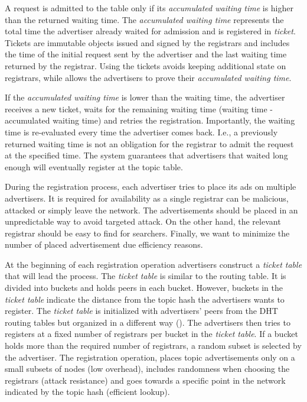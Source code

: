A request is admitted to the table only if its \emph{accumulated waiting time} is higher than the returned waiting time. The \emph{accumulated waiting time} represents the total time the advertiser already waited for admission and is registered in \emph{ticket}. Tickets are immutable objects issued and signed by the registrars and includes the time of the initial request sent by the advertiser and the last waiting time returned by the registrar. Using the tickets avoids keeping additional state on registrars, while allows the advertisers to prove their \emph{accumulated waiting time}. 

If the \emph{accumulated waiting time} is lower than the waiting time, the advertiser receives a new ticket, waits for the remaining waiting time (waiting time - accumulated waiting time) and retries the registration. Importantly, the waiting time is re-evaluated every time the advertiser comes back. I.e., a previously returned waiting time is not an obligation for the registrar to admit the request at the specified time. The system guarantees that advertisers that waited long enough will eventually register at the topic table. 



During the registration process, each advertiser tries to place its ads on multiple advertisers. It is required for availability as a single registrar can be malicious, attacked or simply leave the network. The advertisements should be placed in an unpredictable way to avoid targeted attack. On the other hand, the relevant registrar should be easy to find for searchers. Finally, we want to minimize the number of placed advertisement due efficiency reasons. 

At the beginning of each registration operation advertisers construct a \emph{ticket table} that will lead the process. The \emph{ticket table} is similar to the routing table. It is divided into buckets and holds peers in each bucket. However, buckets in the \emph{ticket table} indicate the distance from the topic hash the advertisers wants to register. The \emph{ticket table} is initialized with advertisers' peers from the DHT routing tables but organized in a different way (). The advertisers then tries to registers at a fixed number of registrars per bucket in the \emph{ticket table}. If a bucket holds more than the required number of registrars, a random subset is selected by the advertiser. The registration operation, places topic advertisements only on a small subsets of nodes (low overhead), includes randomness when choosing the registrars (attack resistance) and goes towards a specific point in the network indicated by the topic hash (efficient lookup).

